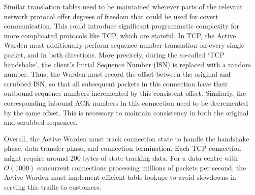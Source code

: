 \documentclass{article}
\begin{document}
Similar translation tables need to be maintained wherever parts of the relevant network protocol offer degrees of freedom that could be used for covert communication. This could introduce significant programmatic complexity for more complicated protocols like TCP, which are stateful. In TCP, the Active Warden must additionally perform sequence number translation on every single packet, and in both directions. More precisely, during the so-called `TCP handshake', the client's Initial Sequence Number (ISN) is replaced with a random number. Thus, the Warden must record the offset between the original and scrubbed ISN, so that all subsequent packets in this connection have their outbound sequence numbers incremented by this consistent offset. Similarly, the corresponding inbound ACK numbers in this connection need to be decremented by the same offset. This is necessary to maintain consistency in both the original and scrubbed sequences.

Overall, the Active Warden must track connection state to handle the handshake phase, data transfer phase, and connection termination. Each TCP connection might require around 200 bytes of state-tracking data. For a data centre with $O(1000)$ concurrent connections processing millions of packets per second, the Active Warden must implement efficient table lookups to avoid slowdowns in serving this traffic to customers.
\end{document}
